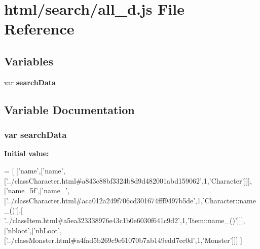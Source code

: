 \section{html/search/all\-\_\-d.js File Reference}
\label{all__d_8js}
\subsection*{Variables}
\begin{DoxyCompactItemize}
\item 
var {\bf search\-Data}
\end{DoxyCompactItemize}


\subsection{Variable Documentation}
\subsubsection[{search\-Data}]{\setlength{\rightskip}{0pt plus 5cm}var search\-Data}\label{all__d_8js_ad01a7523f103d6242ef9b0451861231e}
{\bfseries Initial value\-:}
\begin{DoxyCode}
=
[
  [\textcolor{stringliteral}{'name'},[\textcolor{stringliteral}{'name'},[\textcolor{stringliteral}{'../classCharacter.html#a843c88bf3324b8d9d482001abd159062'},1,\textcolor{stringliteral}{'Character'}]]],
  [\textcolor{stringliteral}{'name\_5f'},[\textcolor{stringliteral}{'name\_'},[\textcolor{stringliteral}{'../classCharacter.html#aca012a249f706cd301674fff9497b5de'},1,\textcolor{stringliteral}{'Character::name\_()'}],[\textcolor{stringliteral}{
      '../classItem.html#a5ea323338976e43c1b0e6030f641c9d2'},1,\textcolor{stringliteral}{'Item::name\_()'}]]],
  [\textcolor{stringliteral}{'nbloot'},[\textcolor{stringliteral}{'nbLoot'},[\textcolor{stringliteral}{'../classMonster.html#a4fad5b269c9e61070b7ab149edd7ec0d'},1,\textcolor{stringliteral}{'Monster'}]]]
]
\end{DoxyCode}
